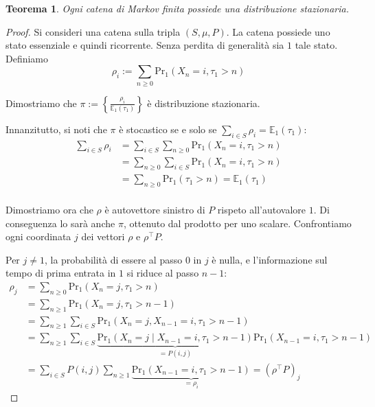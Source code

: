 \documentclass{article}
\theoremstyle{plain}
\newtheorem{thm}{Teorema}
\newcommand{\tra}{^\top}
\newcommand{\ev}{\mathbb E}
\renewcommand{\Pr}{\mathrm{Pr}}
\begin{document}
\begin{thm}
	Ogni catena di Markov finita possiede una distribuzione stazionaria.
\end{thm}
\begin{proof}
	Si consideri una catena sulla tripla $(S,\mu,P)$. La catena possiede uno stato essenziale e quindi ricorrente. Senza perdita di generalità sia $1$ tale stato.
	Definiamo
	\begin{equation*}
		\rho_i := \sum_{n\ge0} \Pr_1(X_n=i, \tau_1>n)
	\end{equation*}

	Dimostriamo che $\pi:=\left\{\frac{\rho_i}{\ev_1(\tau_1)}\right\}$ è distribuzione stazionaria.

	Innanzitutto, si noti che $\pi$ è stocastico se e solo se $\sum_{i\in S} \rho_i=\ev_1(\tau_1)$:
	\begin{align*}
		\sum_{i\in S} \rho_i & = \sum_{i\in S}\sum_{n\ge0} \Pr_1(X_n=i,\tau_1>n) \\
		                     & = \sum_{n\ge0}\sum_{i\in S} \Pr_1(X_n=i,\tau_1>n) \\
		                     & = \sum_{n\ge0} \Pr_1(\tau_1>n) = \ev_1(\tau_1)    \\
	\end{align*}

	Dimostriamo ora che $\rho$ è autovettore sinistro di $P$ rispeto all'autovalore $1$. Di conseguenza lo sarà anche $\pi$, ottenuto dal prodotto per uno scalare. Confrontiamo ogni coordinata $j$ dei vettori $\rho$ e $\rho\tra P$.

	Per $j\ne1$, la probabilità di essere al passo $0$ in $j$ è nulla, e l'informazione sul tempo di prima entrata in $1$ si riduce al passo $n-1$:
	\begin{align*}
		\rho_j & = \sum_{n\ge0}\Pr_1(X_n=j,\tau_1>n)                                                                                 \\
		       & = \sum_{n\ge1}\Pr_1(X_n=j,\tau_1>n-1)                                                                               \\
		       & = \sum_{n\ge1}\sum_{i\in S}\Pr_1(X_n=j,X_{n-1}=i,\tau_1>n-1)                                                        \\
		       & = \sum_{n\ge1}\sum_{i\in S}\underbrace{\Pr_1(X_n=j\mid X_{n-1}=i,\tau_1>n-1)}_{=P(i,j)} \Pr_1(X_{n-1}=i,\tau_1>n-1) \\
		       & = \sum_{i\in S} P(i,j) \sum_{n\ge1} \underbrace{\Pr_1(X_{n-1}=i,\tau_1>n-1)}_{=\rho_i} = (\rho\tra P)_j
	\end{align*}


\end{proof}
\end{document}
